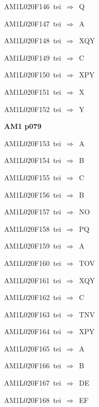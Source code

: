 {\sixrm AM1L020F146\ {\sixit tei}\ }$\Rightarrow$\ Q\par\smallskip
{\sixrm AM1L020F147\ {\sixit tei}\ }$\Rightarrow$\ A\par\smallskip
{\sixrm AM1L020F148\ {\sixit tei}\ }$\Rightarrow$\ XQY\par\smallskip
{\sixrm AM1L020F149\ {\sixit tei}\ }$\Rightarrow$\ C\par\smallskip
{\sixrm AM1L020F150\ {\sixit tei}\ }$\Rightarrow$\ XPY\par\smallskip
{\sixrm AM1L020F151\ {\sixit tei}\ }$\Rightarrow$\ X\par\smallskip
{\sixrm AM1L020F152\ {\sixit tei}\ }$\Rightarrow$\ Y\par\smallskip

\par\vfill\eject
{\bf\hfill AM1 p079\hfill\hbox{}}\par\bigskip
{\sixrm AM1L020F153\ {\sixit tei}\ }$\Rightarrow$\ A\par\smallskip
{\sixrm AM1L020F154\ {\sixit tei}\ }$\Rightarrow$\ B\par\smallskip
{\sixrm AM1L020F155\ {\sixit tei}\ }$\Rightarrow$\ C\par\smallskip
{\sixrm AM1L020F156\ {\sixit tei}\ }$\Rightarrow$\ B\par\smallskip
{\sixrm AM1L020F157\ {\sixit tei}\ }$\Rightarrow$\ NO\par\smallskip
{\sixrm AM1L020F158\ {\sixit tei}\ }$\Rightarrow$\ PQ\par\smallskip
{\sixrm AM1L020F159\ {\sixit tei}\ }$\Rightarrow$\ A\par\smallskip
{\sixrm AM1L020F160\ {\sixit tei}\ }$\Rightarrow$\ TOV\par\smallskip
{\sixrm AM1L020F161\ {\sixit tei}\ }$\Rightarrow$\ XQY\par\smallskip
{\sixrm AM1L020F162\ {\sixit tei}\ }$\Rightarrow$\ C\par\smallskip
{\sixrm AM1L020F163\ {\sixit tei}\ }$\Rightarrow$\ TNV\par\smallskip
{\sixrm AM1L020F164\ {\sixit tei}\ }$\Rightarrow$\ XPY\par\smallskip
{\sixrm AM1L020F165\ {\sixit tei}\ }$\Rightarrow$\ A\par\smallskip
{\sixrm AM1L020F166\ {\sixit tei}\ }$\Rightarrow$\ B\par\smallskip
{\sixrm AM1L020F167\ {\sixit tei}\ }$\Rightarrow$\ DE\par\smallskip
{\sixrm AM1L020F168\ {\sixit tei}\ }$\Rightarrow$\ EF\par\smallskip
